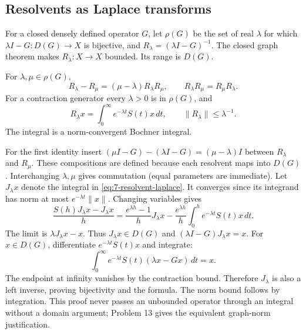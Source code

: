 \Needspace{55mm}
\subsection{Resolvents as Laplace transforms}
For a closed densely defined operator $G$, let $\rho(G)$ be the set of
real $\lambda$ for which $\lambda I-G:D(G)\to X$ is bijective, and
$R_\lambda=(\lambda I-G)^{-1}$. The closed graph theorem makes
$R_\lambda:X\to X$ bounded. Its range is $D(G)$.
\Needspace{55mm}
\begin{theorem}
\label{thm:7-resolvent}
For $\lambda,\mu\in\rho(G)$,
\begin{equation}\label{eq:7-resolvent-id}
 R_\lambda-R_\mu=(\mu-\lambda)R_\lambda R_\mu,\qquad
 R_\lambda R_\mu=R_\mu R_\lambda.
\end{equation}
For a contraction generator every $\lambda>0$ is in $\rho(G)$, and
\begin{equation}\label{eq:7-resolvent-laplace}
 R_\lambda x=\int_0^\infty e^{-\lambda t}S(t)x\,dt,
 \qquad\|R_\lambda\|\leq\lambda^{-1}.
\end{equation}
The integral is a norm-convergent Bochner integral.
\end{theorem}
\begin{expandedproof}
For the first identity insert
$(\mu I-G)-(\lambda I-G)=(\mu-\lambda)I$ between $R_\lambda$ and
$R_\mu$. These compositions are defined because each resolvent maps into
$D(G)$. Interchanging $\lambda,\mu$ gives commutation (equal parameters
are immediate).
Let $J_\lambda x$ denote the integral in \eqref{eq:7-resolvent-laplace}.
It converges since its integrand has norm at most $e^{-\lambda t}\|x\|$.
Changing variables gives
\[
 \frac{S(h)J_\lambda x-J_\lambda x}{h}
 =\frac{e^{\lambda h}-1}{h}J_\lambda x
 -\frac{e^{\lambda h}}h\int_0^he^{-\lambda t}S(t)x\,dt.
\]
The limit is $\lambda J_\lambda x-x$. Thus $J_\lambda x\in D(G)$ and
$(\lambda I-G)J_\lambda x=x$.
For $x\in D(G)$, differentiate $e^{-\lambda t}S(t)x$ and integrate:
\[
 \int_0^\infty e^{-\lambda t}S(t)(\lambda x-Gx)\,dt=x.
\]
The endpoint at infinity vanishes by the contraction bound. Therefore
$J_\lambda$ is also a left inverse, proving bijectivity and the formula.
The norm bound follows by integration. This proof never passes an
unbounded operator through an integral without a domain argument;
Problem 13 gives the equivalent graph-norm justification.
\end{expandedproof}
\Needspace{55mm}

